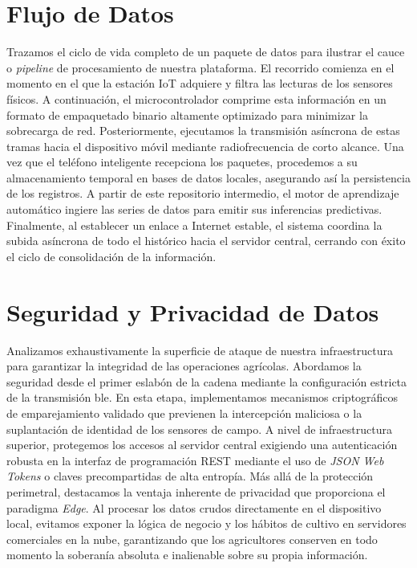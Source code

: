 \section{Flujo de Datos}
Trazamos el ciclo de vida completo de un paquete de datos para ilustrar el cauce o \textit{pipeline} de procesamiento de nuestra plataforma. El recorrido comienza en el momento en el que la estación IoT adquiere y filtra las lecturas de los sensores físicos. A continuación, el microcontrolador comprime esta información en un formato de empaquetado binario altamente optimizado para minimizar la sobrecarga de red. Posteriormente, ejecutamos la transmisión asíncrona de estas tramas hacia el dispositivo móvil mediante radiofrecuencia de corto alcance. Una vez que el teléfono inteligente recepciona los paquetes, procedemos a su almacenamiento temporal en bases de datos locales, asegurando así la persistencia de los registros. A partir de este repositorio intermedio, el motor de aprendizaje automático ingiere las series de datos para emitir sus inferencias predictivas. Finalmente, al establecer un enlace a Internet estable, el sistema coordina la subida asíncrona de todo el histórico hacia el servidor central, cerrando con éxito el ciclo de consolidación de la información.

\section{Seguridad y Privacidad de Datos}
Analizamos exhaustivamente la superficie de ataque de nuestra infraestructura para garantizar la integridad de las operaciones agrícolas. Abordamos la seguridad desde el primer eslabón de la cadena mediante la configuración estricta de la transmisión \gls{ble}. En esta etapa, implementamos mecanismos criptográficos de emparejamiento validado que previenen la intercepción maliciosa o la suplantación de identidad de los sensores de campo. A nivel de infraestructura superior, protegemos los accesos al servidor central exigiendo una autenticación robusta en la interfaz de programación REST mediante el uso de \textit{JSON Web Tokens} o claves precompartidas de alta entropía. Más allá de la protección perimetral, destacamos la ventaja inherente de privacidad que proporciona el paradigma \textit{Edge}. Al procesar los datos crudos directamente en el dispositivo local, evitamos exponer la lógica de negocio y los hábitos de cultivo en servidores comerciales en la nube, garantizando que los agricultores conserven en todo momento la soberanía absoluta e inalienable sobre su propia información.
